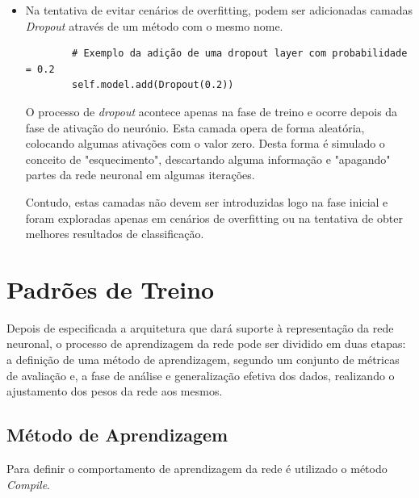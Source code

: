 \begin{itemize}
    \item Na tentativa de evitar cenários de overfitting, podem ser adicionadas camadas \textit{Dropout} através de um método com o mesmo nome.
    
    \begin{verbatim} 
        # Exemplo da adição de uma dropout layer com probabilidade = 0.2
        self.model.add(Dropout(0.2))
    \end{verbatim}
    
    O processo de \textit{dropout} acontece apenas na fase de treino e ocorre depois da fase de ativação do neurónio. 
    Esta camada opera de forma aleatória, colocando algumas ativações com o valor zero. Desta forma é simulado o conceito de "esquecimento", descartando alguma informação e "apagando" partes da rede neuronal em algumas iterações. 

    Contudo, estas camadas não devem ser introduzidas logo na fase inicial e foram exploradas apenas em cenários de overfitting ou na tentativa de obter melhores resultados de classificação. 
\end{itemize}

\section{Padrões de Treino}
\label{sec:padroesTreino}

Depois de especificada a arquitetura que dará suporte à representação da rede neuronal, o processo de aprendizagem da rede pode ser dividido em duas etapas: a definição de uma método de aprendizagem, segundo um conjunto de métricas de avaliação e, a fase de análise e generalização efetiva dos dados, realizando o ajustamento dos pesos da rede aos mesmos. 

\subsection{Método de Aprendizagem}

Para definir o comportamento de aprendizagem da rede é utilizado o método \textit{Compile}. 

